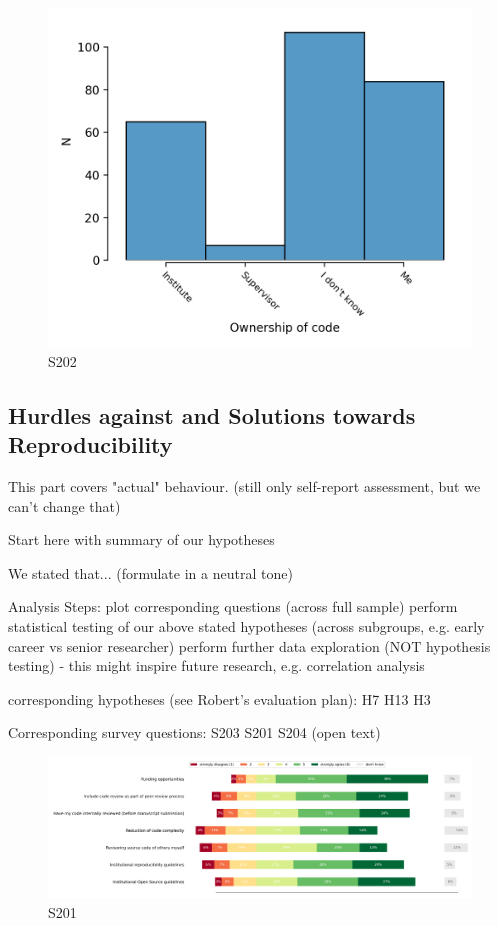 \documentclass{article}
\begin{document}
\begin{figure}[!p]
    \centering
    \includegraphics[width=\textwidth]{../figs/S202.png}
	\caption{S202 }
    \label{fig:S202}
\end{figure}

\subsection{Hurdles against and Solutions towards Reproducibility}

This part covers "actual" behaviour. (still only self-report assessment, but we can't change that)

    Start here with summary of our hypotheses

We stated that... (formulate in a neutral tone)

    Analysis Steps:
        plot corresponding questions (across full sample)
        perform statistical testing of our above stated hypotheses (across subgroups, e.g. early career vs senior researcher)
        perform further data exploration (NOT hypothesis testing) - this might inspire future research, e.g. correlation analysis

    corresponding hypotheses (see Robert's evaluation plan):
        H7
        H13
        H3

    Corresponding survey questions:
        S203
        S201
        S204 (open text)

\begin{figure}[!p]
    \centering
    \includegraphics[width=\textwidth]{../figs/S201.png}
	\caption{S201 }
    \label{fig:S201}
\end{figure}
\end{document}
